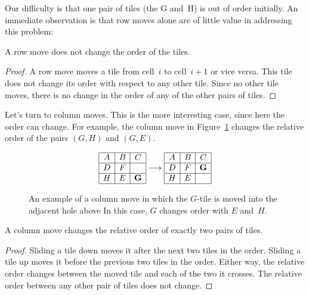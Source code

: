 Our difficulty is that one pair of tiles (the G and~H) is out of order
initially.  An immediate observation is that row moves alone are of
little value in addressing this problem:
\begin{lemma}\label{lem:8puzzleA}
A row move does not change the order of the tiles.
\end{lemma}

\begin{proof}
A row move moves a tile from cell~$i$ to cell~$i + 1$ or vice versa.
This tile does not change its order with respect to any other tile.
Since no other tile moves, there is no change in the order of any of
the other pairs of tiles.
\end{proof}

Let's turn to column moves.  This is the more interesting case, since
here the order can change.  For example, the column move in
Figure~\ref{fig:8columnmove} changes the relative order of the pairs
$(G, H)$ and $(G, E)$.

\begin{figure}
\begin{equation*}
\begin{array}{|c|c|c|}
\hline
A & B & C \\ \hline
D & F &  \\ \hline
H & E & \mathbf{G} \\ \hline
\end{array}
\longrightarrow
\begin{array}{|c|c|c|}
\hline
A & B & C \\ \hline
D & F & \mathbf{G} \\ \hline
H & E &  \\ \hline
\end{array}
\end{equation*}
\caption{An example of a column move in which the $G$-tile is moved
  into the adjacent hole above  In this case, $G$ changes order with
  $E$ and~$H$.}
\label{fig:8columnmove}
\end{figure}

\begin{lemma}\label{lem:8puzzleB}
A column move  changes the relative order of exactly two pairs of
tiles.
\end{lemma}

\begin{proof}
Sliding a tile down moves it after the next two tiles in the order.
Sliding a tile up moves it before the previous two tiles in the
order.  Either way, the relative order changes between the moved tile
and each of the two it crosses.  The relative order between any other
pair of tiles does not change.
\end{proof}

